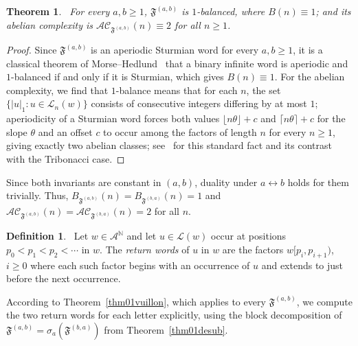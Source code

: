 \documentclass[12pt]{amsart}
\theoremstyle{plain}
\newtheorem{theorem}{Theorem}[section]
\theoremstyle{definition}
\newtheorem{definition}{Definition}
\theoremstyle{remark}
\newcommand{\N}{\mathbb{N}}
\newcommand{\AlphA}{\mathcal{A}}
\newcommand{\FD}{\mathfrak{F}}
\begin{document}
\begin{theorem}~\label{thm01trivialinvariants}
For every $a,b\geqslant 1$,  $\FD^{(a,b)}$ is $1$-balanced, where $B(n)\equiv1$;
and its abelian complexity is $\mathcal{AC}_{\FD^{(a,b)}}(n)\equiv2$ for
all $n\geqslant 1$.
\end{theorem}
\begin{proof}
Since $\FD^{(a,b)}$ is an aperiodic Sturmian
word for every $a,b\geqslant 1$, it is a classical theorem of
Morse--Hedlund~\cite{MorseHedlund1940} that a binary infinite word is
aperiodic and $1$-balanced if and only if it is Sturmian, which gives
$B(n)\equiv1$. For the abelian complexity, we find that $1$-balance means that for
each $n$, the set $\{|u|_1 : u\in\mathcal{L}_n(w)\}$ consists of
consecutive integers differing by at most $1$; aperiodicity of a
Sturmian word forces both values $\lfloor n\theta\rfloor+c$ and
$\lceil n\theta\rceil+c$ for the slope $\theta$ and an offset $c$ to
occur among the factors of length $n$ for every $n\ge1$, giving exactly
two abelian classes; see~\cite{RichommeSaariZamboni2010} for this
standard fact and its contrast with the Tribonacci case.
\end{proof}

Since both invariants are constant in $(a,b)$, duality under
$a\leftrightarrow b$ holds for them trivially. Thus, $B_{\FD^{(a,b)}}(n)=B_{\FD^{(b,a)}}(n)=1$ and $\mathcal{AC}_{\FD^{(a,b)}}(n)=\mathcal{AC}_{\FD^{(b,a)}}(n)=2$ for all $n$.

\begin{definition}~\label{def01returnword}
Let $w\in\AlphA^{\N}$ and let $u\in\mathcal{L}(w)$ occur at positions
$p_0<p_1<p_2<\cdots$ in $w$. The \emph{return words} of $u$ in $w$ are
the factors $w[p_i,p_{i+1})$, $i\geqslant 0$ where each such factor begins with an
occurrence of $u$ and extends to just before the next occurrence.
\end{definition}

According to Theorem~\ref{thm01vuillon}, which applies to
every $\FD^{(a,b)}$, we compute the two return words for each letter
explicitly, using the block decomposition of $\FD^{(a,b)}=\sigma_a(\FD^{(b,a)})$
from Theorem~\ref{thm01desub}.
\end{document}

